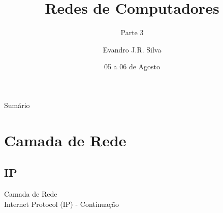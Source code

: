 \documentclass{libs/ufc_format}
\title[ML]{\huge\textbf{Redes de Computadores}}
\subtitle{Parte 3}
\author{Evandro J.R. Silva}
\institute[Estácio Teresina]{
    \normalsize{\email{ejrs.profissional@gmail.com}}
    \newline
    \department{Bacharelado em Ciência da Computação}
    \newline
    \estaciothe
}
\date{05 a 06 de Agosto}
\begin{document}


\begin{frame}{}
    \maketitle
\end{frame}

\begin{frame}{Sumário}
    \begin{multicols}{2}
        \tableofcontents
    \end{multicols}
\end{frame}

\section{Camada de Rede}

\subsection{IP}

\begin{frame}{}
    \centering
    \Large
    Camada de Rede\\
    \large
    Internet Protocol (IP) - Continuação
\end{frame}
\end{document}
